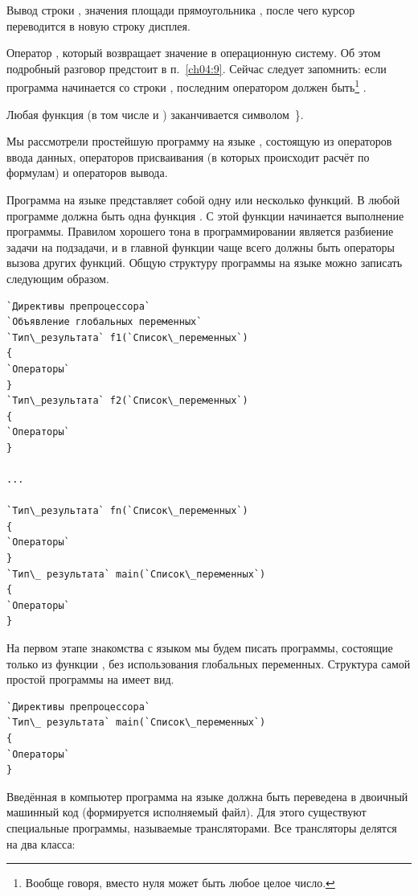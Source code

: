  Вывод строки , значения площади
прямоугольника , после чего курсор переводится в новую строку дисплея.

 Оператор , который возвращает значение в
операционную систему. Об этом подробный разговор предстоит в п.~\ref{ch04:9}.%
Сейчас следует запомнить: если программа
начинается со строки , последним оператором должен быть\footnote{Вообще говоря, вместо нуля может быть любое целое число.}
.

 Любая функция (в том числе и ) заканчивается символом~\}.

Мы рассмотрели простейшую программу на языке , состоящую из операторов ввода 
данных, операторов присваивания (в
которых происходит расчёт по формулам) и операторов вывода. 

Программа на языке  представляет собой одну или несколько функций. 
В любой программе 
должна быть одна функция . С этой функции начинается 
выполнение программы. Правилом хорошего
тона в программировании является разбиение задачи на подзадачи, и в главной функции 
чаще всего должны быть операторы
вызова других функций. Общую структуру программы на 
языке  можно записать следующим
образом. 

\begin{lstlisting}
`Директивы препроцессора`
`Объявление глобальных переменных`
`Тип\_результата` f1(`Список\_переменных`)
{
`Операторы`
}
`Тип\_результата` f2(`Список\_переменных`)
{
`Операторы`
}

...

`Тип\_результата` fn(`Список\_переменных`)
{
`Операторы`
}
`Тип\_ результата` main(`Список\_переменных`)
{
`Операторы`
}
\end{lstlisting}

На первом этапе знакомства с языком мы будем писать программы, состоящие только из функции , без использования
глобальных переменных. Структура самой  простой программы на  имеет вид.
\begin{lstlisting}
`Директивы препроцессора`
`Тип\_ результата` main(`Список\_переменных`)
{
`Операторы`
}
\end{lstlisting}

Введённая в компьютер программа на языке  должна быть переведена в двоичный машинный код (формируется
исполняемый файл). Для этого существуют специальные программы, называемые трансляторами. Все
трансляторы  делятся на два класса:

